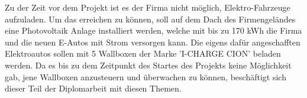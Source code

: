 
Zu der Zeit vor dem Projekt ist es der Firma nicht möglich, Elektro-Fahrzeuge aufzuladen. Um das erreichen zu können, soll auf dem Dach des Firmengeländes eine Photovoltaik Anlage installiert werden, welche mit bis zu 170 kWh die Firma und die neuen E-Autos mit Strom versorgen kann. Die eigens dafür angeschafften Elektroautos sollen mit 5 Wallboxen der Marke 'I-CHARGE CION' beladen werden. Da es bis zu dem Zeitpunkt des Startes des Projekts keine Möglichkeit gab, jene Wallboxen anzusteuern und überwachen zu können, beschäftigt sich dieser Teil der Diplomarbeit mit diesen Themen. 